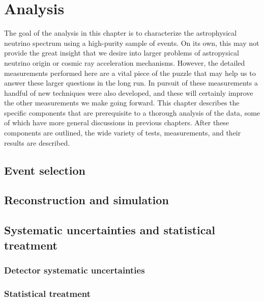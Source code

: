 \chapter{Analysis}

The goal of the analysis in this chapter is to characterize the astrophysical neutrino spectrum using a high-purity sample of events.
On its own, this may not provide the great insight that we desire into larger problems of astropysical neutrino origin or cosmic ray acceleration mechanisms.
However, the detailed measurements performed here are a vital piece of the puzzle that may help us to answer these larger questions in the long run.
In pursuit of these measurements a handful of new techniques were also developed, and these will certainly improve the other measurements we make going forward.
This chapter describes the specific components that are prerequisite to a thorough analysis of the data, some of which have more general discussions in previous chapters.
After these components are outlined, the wide variety of tests, measurements, and their results are described.

\section{Event selection}



\section{Reconstruction and simulation}
\begingroup
\graphicspath{{results/HESE_Final_Paper/}}

\endgroup

\section{Systematic uncertainties and statistical treatment\label{sec:uncertainties}}
\subsection{Detector systematic uncertainties\label{sec:detector_systematics}}
\begingroup
\graphicspath{{results/HESE_Final_Paper/}}

\endgroup

\subsection{Statistical treatment\label{sec:statistics}}
\begingroup
\graphicspath{{results/HESE_Final_Paper/}}

\endgroup

